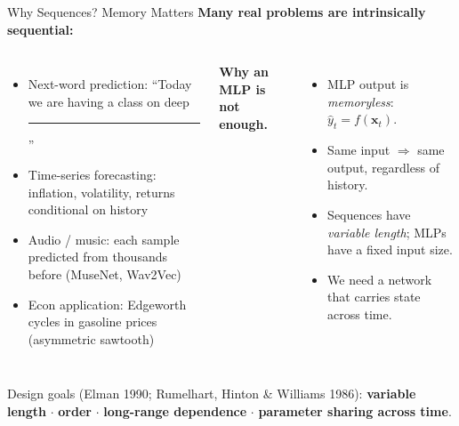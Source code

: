 \documentclass[aspectratio=169,11pt]{beamer}
\newcommand{\emphc}[1]{\textcolor{harvardcrimson}{#1}}
\newcommand{\x}{\bm{x}}
\begin{document}

\begin{frame}{Why Sequences? Memory Matters}
\footnotesize
\textbf{Many real problems are intrinsically sequential:}
\begin{columns}[T]
\begin{itemize}\itemsep1pt
    \item \emphc{Next-word prediction:} ``Today we are having a class on deep \rule{0.9cm}{0.4pt}''
    \item \emphc{Time-series forecasting:} inflation, volatility, returns conditional on history
    \item \emphc{Audio / music:} each sample predicted from thousands before (MuseNet, Wav2Vec)
    \item \emphc{Econ application:} Edgeworth cycles in gasoline prices (asymmetric sawtooth)
\end{itemize}

\textbf{Why an MLP is not enough.}
\begin{itemize}\itemsep1pt
    \item MLP output is \emph{memoryless}: $\hat{y}_t = f(\x_t)$.
    \item Same input $\Rightarrow$ same output, regardless of history.
    \item Sequences have \emph{variable length}; MLPs have a fixed input size.
    \item We need a network that \emphc{carries state across time}.
\end{itemize}
\end{columns}

\vspace{5pt}
\begin{center}
\small
\emphc{Design goals} (Elman 1990; Rumelhart, Hinton \& Williams 1986): \textbf{variable length} $\cdot$ \textbf{order} $\cdot$ \textbf{long-range dependence} $\cdot$ \textbf{parameter sharing across time}.
\end{center}
\end{frame}
\end{document}
